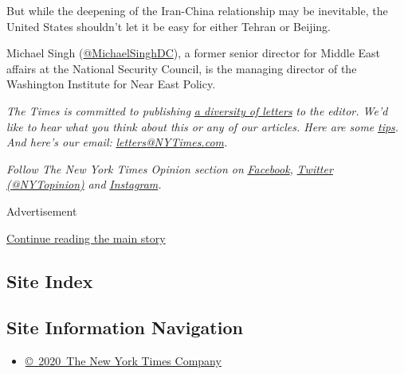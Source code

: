 But while the deepening of the Iran-China relationship may be
inevitable, the United States shouldn't let it be easy for either Tehran
or Beijing.

Michael Singh
(\href{https://twitter.com/MichaelSinghDC}{@MichaelSinghDC}), a former
senior director for Middle East affairs at the National Security
Council, is the managing director of the Washington Institute for Near
East Policy.

\emph{The Times is committed to publishing}
\href{https://www.nytimes3xbfgragh.onion/2019/01/31/opinion/letters/letters-to-editor-new-york-times-women.html}{\emph{a
diversity of letters}} \emph{to the editor. We'd like to hear what you
think about this or any of our articles. Here are some}
\href{https://help.nytimes3xbfgragh.onion/hc/en-us/articles/115014925288-How-to-submit-a-letter-to-the-editor}{\emph{tips}}\emph{.
And here's our email:}
\href{mailto:letters@NYTimes.com}{\emph{letters@NYTimes.com}}\emph{.}

\emph{Follow The New York Times Opinion section on}
\href{https://www.facebookcorewwwi.onion/nytopinion}{\emph{Facebook}}\emph{,}
\href{http://twitter.com/NYTOpinion}{\emph{Twitter (@NYTopinion)}}
\emph{and}
\href{https://www.instagram.com/nytopinion/}{\emph{Instagram}}\emph{.}

Advertisement

\protect\hyperlink{after-bottom}{Continue reading the main story}

\hypertarget{site-index}{%
\subsection{Site Index}\label{site-index}}

\hypertarget{site-information-navigation}{%
\subsection{Site Information
Navigation}\label{site-information-navigation}}

\begin{itemize}
\tightlist
\item
  \href{https://help.nytimes3xbfgragh.onion/hc/en-us/articles/115014792127-Copyright-notice}{©~2020~The
  New York Times Company}
\end{itemize}

